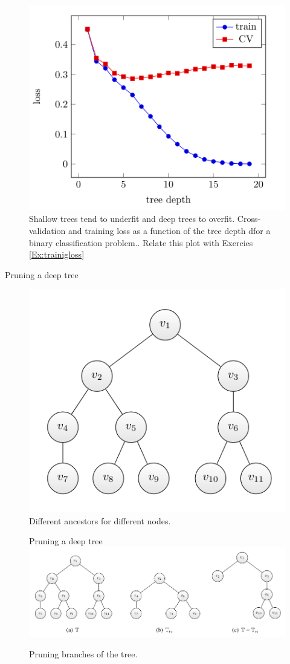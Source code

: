 \documentclass{beamer}
\begin{document}
\begin{frame}
    \begin{figure}
        \includegraphics[width=0.7\linewidth]{F86Kroese}
        \caption{Shallow trees tend to underfit and deep trees to overfit. Cross-validation and training loss as a function of the tree depth dfor a binary classification problem.\cite{kroese2020}. Relate this plot with Exercies \ref{Ex:trainigloss}}
    \end{figure}
\end{frame}

\begin{frame}{Pruning a deep tree}
    \begin{figure}
        \includegraphics[width=0.7\linewidth]{F87Kroese}
        \caption{Different ancestors for different nodes.\cite{kroese2020}}
    \end{figure}
\end{frame}

\begin{frame}
    \begin{figure}{Pruning a deep tree}
        \includegraphics[width=0.9\linewidth]{F88Kroese}
        \caption{Pruning branches of the tree.\cite{kroese2020}}
    \end{figure}
\end{frame}
\end{document}
